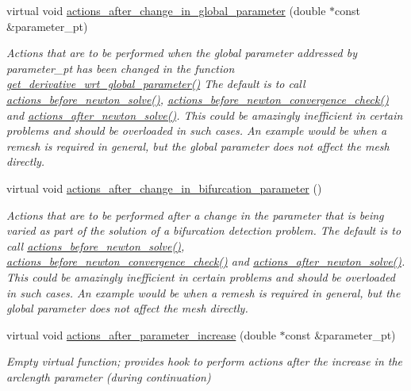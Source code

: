 \begin{DoxyCompactItemize}
virtual void \hyperlink{classoomph_1_1Problem_a1e90bbe5d279295b97ae704487259bcc}{actions\+\_\+after\+\_\+change\+\_\+in\+\_\+global\+\_\+parameter} (double $\ast$const \&parameter\+\_\+pt)
\begin{DoxyCompactList}\small\item\em Actions that are to be performed when the global parameter addressed by parameter\+\_\+pt has been changed in the function \hyperlink{classoomph_1_1Problem_af4d959a47ef6a8d50b394a6761dfab5a}{get\+\_\+derivative\+\_\+wrt\+\_\+global\+\_\+parameter()} The default is to call \hyperlink{classoomph_1_1Problem_a0c8d70891f7369bb4bf8412fa1a08ecb}{actions\+\_\+before\+\_\+newton\+\_\+solve()}, \hyperlink{classoomph_1_1Problem_ae6ad96ddf5d48b517b89c9a9b879bc4b}{actions\+\_\+before\+\_\+newton\+\_\+convergence\+\_\+check()} and \hyperlink{classoomph_1_1Problem_a033ec7301123deeb7e56d04c38f9f1da}{actions\+\_\+after\+\_\+newton\+\_\+solve()}. This could be amazingly inefficient in certain problems and should be overloaded in such cases. An example would be when a remesh is required in general, but the global parameter does not affect the mesh directly. \end{DoxyCompactList}\item 
virtual void \hyperlink{classoomph_1_1Problem_a5f08629e3c9c72b441ec7f19f175b2c7}{actions\+\_\+after\+\_\+change\+\_\+in\+\_\+bifurcation\+\_\+parameter} ()
\begin{DoxyCompactList}\small\item\em Actions that are to be performed after a change in the parameter that is being varied as part of the solution of a bifurcation detection problem. The default is to call \hyperlink{classoomph_1_1Problem_a0c8d70891f7369bb4bf8412fa1a08ecb}{actions\+\_\+before\+\_\+newton\+\_\+solve()}, \hyperlink{classoomph_1_1Problem_ae6ad96ddf5d48b517b89c9a9b879bc4b}{actions\+\_\+before\+\_\+newton\+\_\+convergence\+\_\+check()} and \hyperlink{classoomph_1_1Problem_a033ec7301123deeb7e56d04c38f9f1da}{actions\+\_\+after\+\_\+newton\+\_\+solve()}. This could be amazingly inefficient in certain problems and should be overloaded in such cases. An example would be when a remesh is required in general, but the global parameter does not affect the mesh directly. \end{DoxyCompactList}\item 
virtual void \hyperlink{classoomph_1_1Problem_a54e18ddf6073f9debd478f6b21a717de}{actions\+\_\+after\+\_\+parameter\+\_\+increase} (double $\ast$const \&parameter\+\_\+pt)
\begin{DoxyCompactList}\small\item\em Empty virtual function; provides hook to perform actions after the increase in the arclength parameter (during continuation) \end{DoxyCompactList}\item 

\end{DoxyCompactItemize}
